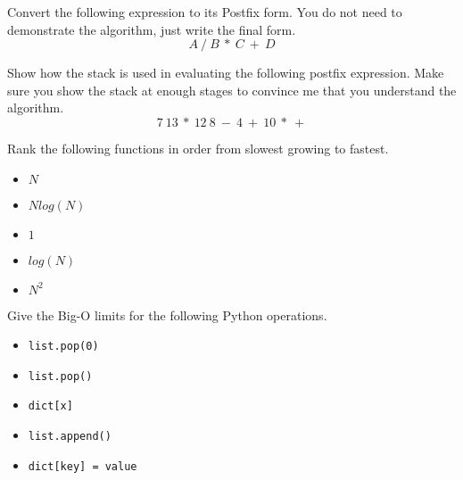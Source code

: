 \documentclass[11pt]{exam}
\begin{document}
\begin{questions}





\question[5] Convert the following expression to its Postfix form.  You do not need to demonstrate the algorithm, just write the final form.
$$A~/~B~*~C~+~D$$
\vspace{1.5in}

\question[5] Show how the stack is used in evaluating the following postfix expression.  Make sure you show the stack at enough stages to convince me that you understand the algorithm.
$$7~13~*~12~8~-~4~+~10~*~+$$
\vspace{1.5in}

\newpage
\question[5] Rank the following functions in order from slowest
growing to fastest.
\begin{itemize}
\item $N$
\item $N log(N)$
\item $1$
\item $log(N)$
\item $N^2$
\end{itemize}

\question[5] Give the Big-O limits for the following Python operations.
\begin{itemize}
\item \texttt{list.pop(0)}
\item \texttt{list.pop()}
\item \texttt{dict[x]}
\item \texttt{list.append()}
\item \texttt{dict[key] = value}
\end{itemize}


\end{questions}
\end{document}
